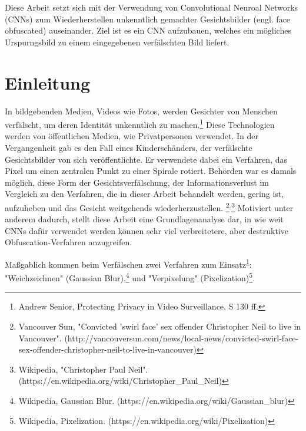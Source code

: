 \documentclass[
12pt, %
a4paper, %
oneside, %
headinclude,footinclude, %
BCOR5mm, %
german]{scrartcl}
\begin{document}
Diese Arbeit setzt sich mit der Verwendung von Convolutional Neuroal Networks (CNNs) zum Wiederherstellen
unkenntlich gemachter Gesichtsbilder (engl. face obfuscated) auseinander. Ziel ist es ein CNN aufzubauen,
welches ein mögliches Urspurngsbild zu einem eingegebenen verfälschten Bild liefert.




\newpage %


\section{Einleitung}

In bildgebenden Medien, Videos wie Fotos, werden Gesichter von Menschen verfälscht, um deren Identität unkenntlich
zu machen.\footnote{Andrew Senior, Protecting Privacy in Video Surveillance, S 130 ff.\label{fn:protecting_privacy}}
Diese Technologien werden von
öffentlichen Medien, wie Privatpersonen verwendet. In der Vergangenheit
gab es den Fall eines Kinderschänders, der verfälschte Gesichtsbilder von sich veröffentlichte. Er verwendete dabei
ein Verfahren, das Pixel um einen zentralen Punkt zu einer Spirale rotiert. Behörden war es damals möglich, diese
Form der Gesichtsverfälschung, der Informationsverlust im Vergleich zu den Verfahren, die in dieser Arbeit behandelt
werden, gering ist, aufzuheben und das Gesicht weitgehends wiederherzustellen.
\footnote{Vancouver Sun, "Convicted 'swirl face' sex offender Christopher Neil to live in Vancouver".
(http://vancouversun.com/news/local-news/convicted-swirl-face-sex-offender-christopher-neil-to-live-in-vancouver)
}$^{,}$\footnote{Wikipedia, "Christopher Paul Neil". (https://en.wikipedia.org/wiki/Christopher\_Paul\_Neil)}
Motiviert unter anderem dadurch,
stellt diese Arbeit eine Grundlagenanalyse dar, in wie weit CNNs dafür verwendet werden können sehr viel verbreitetere,
aber destruktive Obfuscation-Verfahren anzugreifen.

Maßgablich kommen beim Verfälschen zwei Verfahren zum Einsatz\textsuperscript{\ref{fn:protecting_privacy}}:
"Weichzeichnen" (Gaussian Blur),\footnote{Wikipedia, Gaussian Blur. (https://en.wikipedia.org/wiki/Gaussian\_blur)}
und "Verpixelung" (Pixelization)\footnote{Wikipedia, Pixelization. (https://en.wikipedia.org/wiki/Pixelization)\label{label:pixelization}}.
\end{document}
